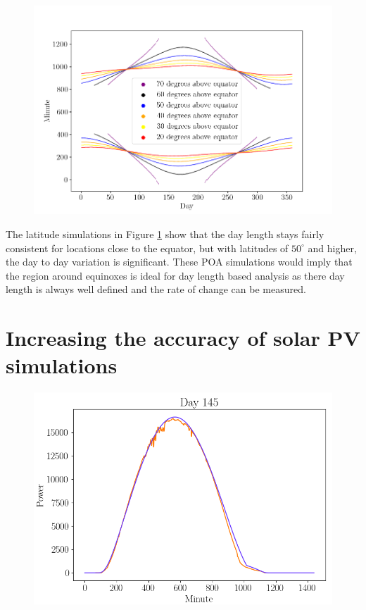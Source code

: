 \begin{figure}[ht!]
\centering
\includegraphics[width=1\linewidth]{pics/poa_var_lat}
\label{fig_poa_var_lat}
\end{figure}

\noindent The latitude simulations in Figure \ref{fig_poa_var_lat} show that the day length stays fairly consistent for locations close to the equator, but with latitudes of $50^\circ$ and higher, the day to day variation is significant. These POA simulations would imply that the region around equinoxes is ideal for day length based analysis as there day length is always well defined and the rate of change can be measured. 


\newpage

\section{Increasing the accuracy of solar PV simulations}
\label{section_increased_accuracy_simulations}


\begin{figure}[h]
\centering
\includegraphics[width=0.7\linewidth]{pics/poa_eval_single_day}
\label{fig-poa_eval_single_day}
\end{figure}

